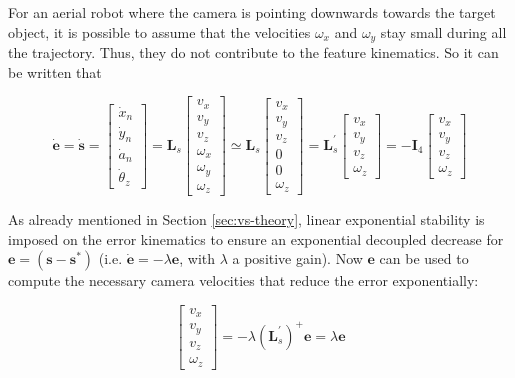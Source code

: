 For an aerial robot where the camera is pointing downwards towards the target object, it is possible to assume that the velocities $\omega_x$ and $\omega_y$ stay small during all the trajectory. Thus, they do not contribute to the feature kinematics. So it can be written that

\begin{equation}
\dot{\bm{e}} = \dot{\bm{s}}
=
\begin{bmatrix}
\dot{x}_n\\ 
\dot{y}_n\\ 
\dot{a}_n\\ 
\dot{\theta}_z
\end{bmatrix}
=
\bm{L}_s
\begin{bmatrix}
v_x\\ 
v_y\\ 
v_z\\ 
\omega_x\\ 
\omega_y\\ 
\omega_z
\end{bmatrix}
\simeq
\bm{L}_s
\begin{bmatrix}
v_x\\ 
v_y\\ 
v_z\\ 
0\\
0\\
\omega_z
\end{bmatrix}
=
\bm{L}_s^{'}
\begin{bmatrix}
v_x\\ 
v_y\\ 
v_z\\ 
\omega_z
\end{bmatrix}
=
- \bm{I}_4 
\begin{bmatrix}
v_x\\ 
v_y\\ 
v_z\\ 
\omega_z
\end{bmatrix}
\end{equation}

As already mentioned in Section \ref{sec:vs-theory}, linear exponential stability is imposed on the error kinematics to ensure an exponential decoupled decrease for $\bm{e} = (\bm{s} - \bm{s}^\ast)$ (i.e. $\dot{\bm{e}} = - \lambda \bm{e}$, with $\lambda$ a positive gain). Now $\bm{e}$ can be used to compute the necessary camera velocities that reduce the error exponentially:

\begin{equation}
\begin{bmatrix}
v_x\\ 
v_y\\ 
v_z\\ 
\omega_z
\end{bmatrix}
=
- \lambda \left( \bm{L}_s^{'}\right)^+ \bm{e}
=
\lambda \bm{e}
\end{equation}

